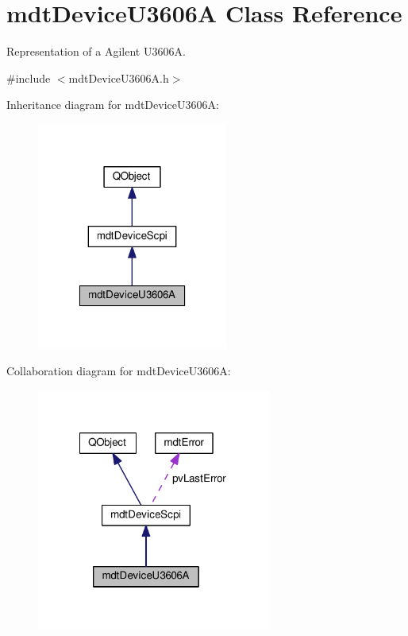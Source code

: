 \hypertarget{classmdt_device_u3606_a}{\section{mdt\-Device\-U3606\-A Class Reference}
\label{classmdt_device_u3606_a}
}


Representation of a Agilent U3606\-A.  




{\ttfamily \#include $<$mdt\-Device\-U3606\-A.\-h$>$}



Inheritance diagram for mdt\-Device\-U3606\-A\-:\nopagebreak
\begin{figure}[H]
\begin{center}
\leavevmode
\includegraphics[width=178pt]{classmdt_device_u3606_a__inherit__graph}
\end{center}
\end{figure}


Collaboration diagram for mdt\-Device\-U3606\-A\-:\nopagebreak
\begin{figure}[H]
\begin{center}
\leavevmode
\includegraphics[width=218pt]{classmdt_device_u3606_a__coll__graph}
\end{center}
\end{figure}
